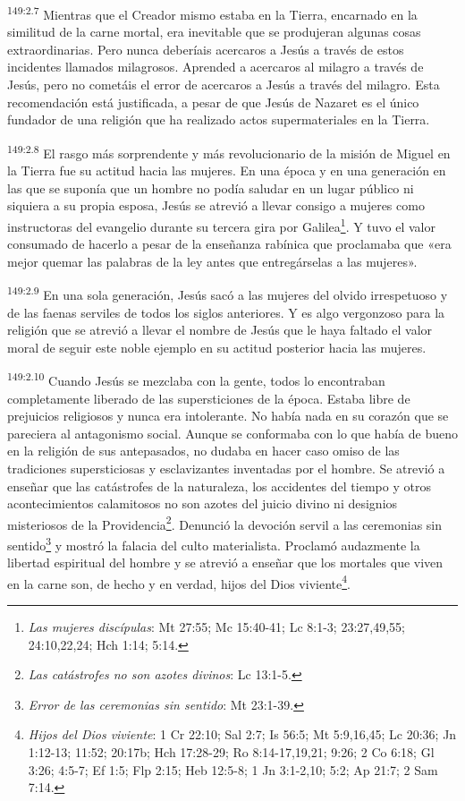 \par 
\textsuperscript{149:2.7} Mientras que el Creador mismo estaba en la Tierra, encarnado en la similitud de la carne mortal, era inevitable que se produjeran algunas cosas extraordinarias. Pero nunca deberíais acercaros a Jesús a través de estos incidentes llamados milagrosos. Aprended a acercaros al milagro a través de Jesús, pero no cometáis el error de acercaros a Jesús a través del milagro. Esta recomendación está justificada, a pesar de que Jesús de Nazaret es el único fundador de una religión que ha realizado actos supermateriales en la Tierra.

\par 
\textsuperscript{149:2.8} El rasgo más sorprendente y más revolucionario de la misión de Miguel en la Tierra fue su actitud hacia las mujeres. En una época y en una generación en las que se suponía que un hombre no podía saludar en un lugar público ni siquiera a su propia esposa, Jesús se atrevió a llevar consigo a mujeres como instructoras del evangelio durante su tercera gira por Galilea\footnote{\textit{Las mujeres discípulas}: Mt 27:55; Mc 15:40-41; Lc 8:1-3; 23:27,49,55; 24:10,22,24; Hch 1:14; 5:14.}. Y tuvo el valor consumado de hacerlo a pesar de la enseñanza rabínica que proclamaba que «era mejor quemar las palabras de la ley antes que entregárselas a las mujeres».

\par 
\textsuperscript{149:2.9} En una sola generación, Jesús sacó a las mujeres del olvido irrespetuoso y de las faenas serviles de todos los siglos anteriores. Y es algo vergonzoso para la religión que se atrevió a llevar el nombre de Jesús que le haya faltado el valor moral de seguir este noble ejemplo en su actitud posterior hacia las mujeres.

\par 
\textsuperscript{149:2.10} Cuando Jesús se mezclaba con la gente, todos lo encontraban completamente liberado de las supersticiones de la época. Estaba libre de prejuicios religiosos y nunca era intolerante. No había nada en su corazón que se pareciera al antagonismo social. Aunque se conformaba con lo que había de bueno en la religión de sus antepasados, no dudaba en hacer caso omiso de las tradiciones supersticiosas y esclavizantes inventadas por el hombre. Se atrevió a enseñar que las catástrofes de la naturaleza, los accidentes del tiempo y otros acontecimientos calamitosos no son azotes del juicio divino ni designios misteriosos de la Providencia\footnote{\textit{Las catástrofes no son azotes divinos}: Lc 13:1-5.}. Denunció la devoción servil a las ceremonias sin sentido\footnote{\textit{Error de las ceremonias sin sentido}: Mt 23:1-39.} y mostró la falacia del culto materialista. Proclamó audazmente la libertad espiritual del hombre y se atrevió a enseñar que los mortales que viven en la carne son, de hecho y en verdad, hijos del Dios viviente\footnote{\textit{Hijos del Dios viviente}: 1 Cr 22:10; Sal 2:7; Is 56:5; Mt 5:9,16,45; Lc 20:36; Jn 1:12-13; 11:52; 20:17b; Hch 17:28-29; Ro 8:14-17,19,21; 9:26; 2 Co 6:18; Gl 3:26; 4:5-7; Ef 1:5; Flp 2:15; Heb 12:5-8; 1 Jn 3:1-2,10; 5:2; Ap 21:7; 2 Sam 7:14.}.

